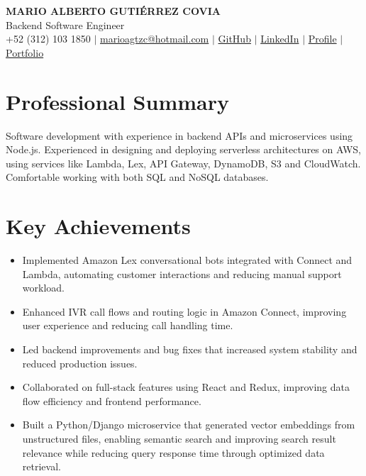 \documentclass[10pt,letterpaper]{article}
\begin{document}
\begin{center}
    {\Large \bfseries \color{darkgray} MARIO ALBERTO GUTIÉRREZ COVIA}\\[2pt]
    {Backend Software Engineer}\\[4pt]
    \small
    +52 (312) 103 1850 \;$\vert$\;
    \href{mailto:marioagtzc@hotmail.com}{marioagtzc@hotmail.com} \;$\vert$\;
    \href{https://github.com/MarioAGtzC}{GitHub} \;$\vert$\;
    \href{https://www.linkedin.com/in/marioagtz/}{LinkedIn} \;$\vert$\;
    \href{https://mario-gutierrez.com/}{Profile} \;$\vert$\;
    \href{https://portfolio.mario-gutierrez.com/}{Portfolio}
\end{center}

\section*{Professional Summary}
Software development with experience in backend APIs and microservices using Node.js. Experienced in designing and deploying serverless architectures on AWS, using services like Lambda, Lex, API Gateway, DynamoDB, S3 and CloudWatch. Comfortable working with both SQL and NoSQL databases.

\section*{Key Achievements}
\begin{itemize}
    \item Implemented Amazon Lex conversational bots integrated with Connect and Lambda, automating customer interactions and reducing manual support workload.
    \item Enhanced IVR call flows and routing logic in Amazon Connect, improving user experience and reducing call handling time.
    \item Led backend improvements and bug fixes that increased system stability and reduced production issues.
    \item Collaborated on full-stack features using React and Redux, improving data flow efficiency and frontend performance.
    \item Built a Python/Django microservice that generated vector embeddings from unstructured files, enabling semantic search and improving search result relevance while reducing query response time through optimized data retrieval.
\end{itemize}
\end{document}
